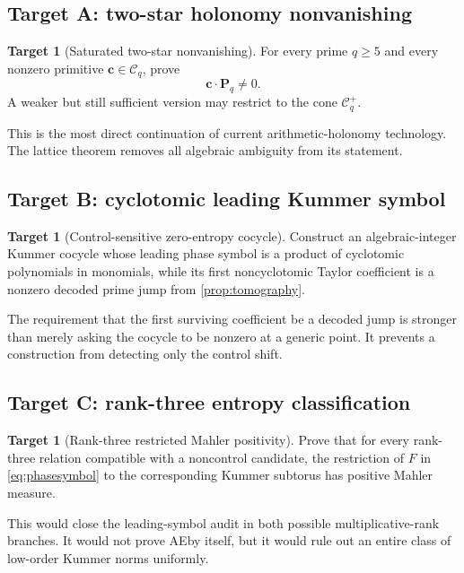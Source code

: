 \documentclass[11pt]{article}
\theoremstyle{definition}
\newtheorem{target}[theorem]{Target}
\theoremstyle{remark}
\newcommand{\AEconj}{\textsc{AE}}
\newcommand{\cC}{\mathcal C}
\newcommand{\vct}[1]{\bm{#1}}
\begin{document}
\subsection{Target A: two-star holonomy nonvanishing}

\begin{target}[Saturated two-star nonvanishing]\label{target:A}
For every prime $q\ge5$ and every nonzero primitive
$\vct c\in\cC_q$, prove
\[
 \vct c\cdot\vct P_q\ne0.
\]
A weaker but still sufficient version may restrict to the cone $\cC_q^+$.
\end{target}

This is the most direct continuation of current arithmetic-holonomy technology.
The lattice theorem removes all algebraic ambiguity from its statement.

\subsection{Target B: cyclotomic leading Kummer symbol}

\begin{target}[Control-sensitive zero-entropy cocycle]\label{target:B}
Construct an algebraic-integer Kummer cocycle whose leading phase symbol is a
product of cyclotomic polynomials in monomials, while its first noncyclotomic
Taylor coefficient is a nonzero decoded prime jump from
\cref{prop:tomography}.
\end{target}

The requirement that the first surviving coefficient be a decoded jump is
stronger than merely asking the cocycle to be nonzero at a generic point.  It
prevents a construction from detecting only the control shift.

\subsection{Target C: rank-three entropy classification}

\begin{target}[Rank-three restricted Mahler positivity]\label{target:C}
Prove that for every rank-three relation compatible with a noncontrol candidate,
the restriction of $F$ in \eqref{eq:phasesymbol} to the corresponding Kummer
subtorus has positive Mahler measure.
\end{target}

This would close the leading-symbol audit in both possible multiplicative-rank
branches.  It would not prove \AEconj by itself, but it would rule out an entire class
of low-order Kummer norms uniformly.
\end{document}
